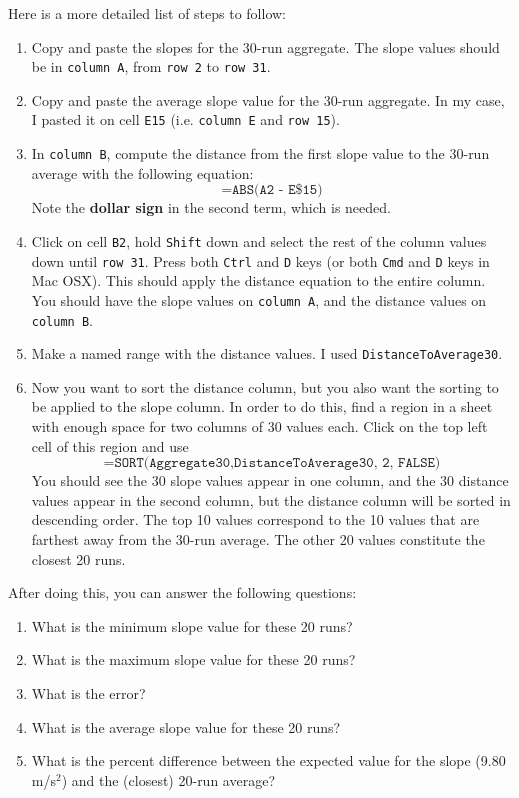 Here is a more detailed list of steps to follow:
\begin{enumerate}
    \item Copy and paste the slopes for the 30-run aggregate. The slope values should be in \texttt{column A}, from \texttt{row 2} to \texttt{row 31}.
    \item Copy and paste the average slope value for the 30-run aggregate. In my case, I pasted it on cell \texttt{E15} (i.e. \texttt{column E} and \texttt{row 15}).
    \item In \texttt{column B}, compute the distance from the first slope value to the 30-run average with the following equation:
    \begin{equation}
        \texttt{=ABS(A2 - E\$15)}
    \end{equation}
    Note the \textbf{dollar sign} in the second term, which is needed.
    \item Click on cell \texttt{B2}, hold \texttt{Shift} down and select the rest of the column values down until \texttt{row 31}. Press both \texttt{Ctrl} and \texttt{D} keys (or both \texttt{Cmd} and \texttt{D} keys in Mac OSX). This should apply the distance equation to the entire column. You should have the slope values on \texttt{column A}, and the distance values on \texttt{column B}.
    \item Make a named range with the distance values. I used \texttt{DistanceToAverage30}.
    \item Now you want to sort the distance column, but you also want the sorting to be applied to the slope column. In order to do this, find a region in a sheet with enough space for two columns of 30 values each. Click on the top left cell of this region and use
    \begin{equation}
        \texttt{=SORT({Aggregate30,DistanceToAverage30}, 2, FALSE)}
    \end{equation}
    You should see the 30 slope values appear in one column, and the 30 distance values appear in the second column, but the distance column will be sorted in descending order. The top 10 values correspond to the 10 values that are farthest away from the 30-run average. The other 20 values constitute the closest 20 runs.
\end{enumerate}
After doing this, you can answer the following questions:
\begin{enumerate}
    \item What is the minimum slope value for these 20 runs?
    \item What is the maximum slope value for these 20 runs?
    \item What is the error?
    \item What is the average slope value for these 20 runs?
    \item What is the percent difference between the expected value for the slope (9.80 m/s$^{2}$) and the (closest) 20-run average?
\end{enumerate}
%

